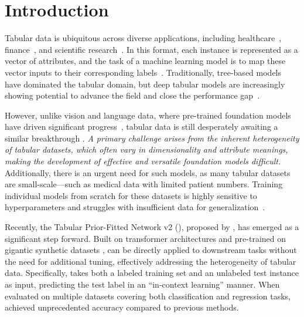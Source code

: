 \section{Introduction}
Tabular data is ubiquitous across diverse applications, including healthcare~\cite{hyland2020early}, finance~\cite{kovalerchuk2005data}, and scientific research~\cite{ivanciuc2007applications,hyland2020early}. In this format, each instance is represented as a vector of attributes, and the task of a machine learning model is to map these vector inputs to their corresponding labels~\cite{Borisov2024Deep}. Traditionally, tree-based models~\cite{Prokhorenkova2018Catboost,chen2016xgboost} have dominated the tabular domain, but deep tabular models are increasingly showing potential to advance the field and close the performance gap~\cite{GorishniyRKB21Revisiting,David2024RealMLP,Ye2024ModernNCA}.

However, unlike vision and language data, where pre-trained foundation models have driven significant progress~\cite{Kirillov2023Segment,zhou2024comprehensive}, tabular data is still desperately awaiting a similar breakthrough \cite{Somepalli2021SAINT,Hollmann2022TabPFN,Onishi2023TabRet,zhu2023xtab,Ye2023TabPTM,BreugelS24PositionTabular}. \emph{A primary challenge arises from the inherent heterogeneity of tabular datasets, which often vary in dimensionality and attribute meanings, making the development of effective and versatile foundation models difficult.}  Additionally, there is an urgent need for such models, as many tabular datasets are small-scale---such as medical data with limited patient numbers. Training individual models from scratch for these datasets is highly sensitive to hyperparameters and struggles with insufficient data for generalization~\cite{FeurerKESBH15,guyon2019analysis,Han2024FeatLLM}.

Recently, the Tabular Prior-Fitted Network v2 (\ours), proposed by \citet{hollmann2025TabPFNv2}, has emerged as a significant step forward. Built on transformer architectures \cite{vaswani2017attention} and pre-trained on gigantic synthetic datasets \cite{Hollmann2022TabPFN,hollmann2025TabPFNv2}, \ours can be directly applied to downstream tasks without the need for additional tuning, effectively addressing the heterogeneity of tabular data. Specifically, \ours takes both a labeled training set and an unlabeled test instance as input, predicting the test label in an ``in-context learning'' manner. When evaluated on multiple datasets covering both classification and regression tasks, \ours achieved unprecedented accuracy compared to previous methods.

